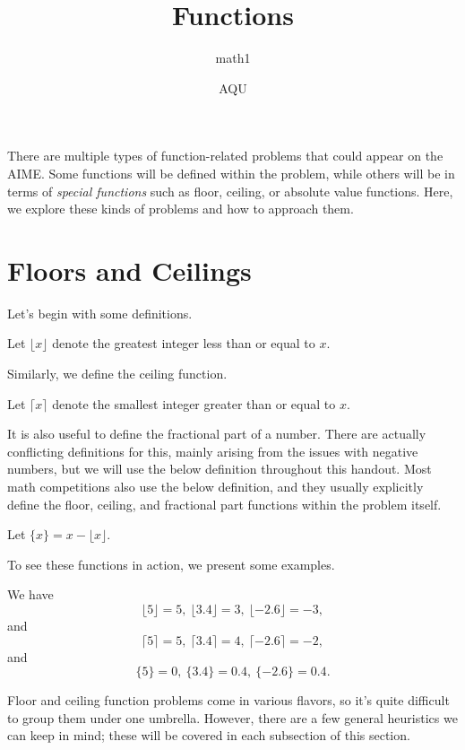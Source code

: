 \documentclass{article}
\title{Functions}
\author{math1}
\date{AQU}
\begin{document}
\maketitle
There are multiple types of function-related problems that could appear on the AIME.  Some functions will be defined within the problem,  while others will be in terms of \emph{special functions} such as floor,  ceiling, or absolute value functions.  Here, we explore these kinds of problems and how to approach them.

\section{Floors and Ceilings}

Let's begin with some definitions.

\begin{defi}
Let $\lfloor x \rfloor$ denote the greatest integer less than or equal to $x$.
\end{defi}

Similarly, we define the ceiling function.

\begin{defi}
Let $\lceil x \rceil$ denote the smallest integer greater than or equal to $x$.
\end{defi}

It is also useful to define the fractional part of a number. There are actually conflicting definitions for this, mainly arising from the issues with negative numbers, but we will use the below definition throughout this handout. Most math competitions also use the below definition, and they usually explicitly define the floor, ceiling, and fractional part functions within the problem itself.

\begin{defi}
Let $\{ x \} = x - \lfloor x \rfloor$.
\end{defi}

To see these functions in action, we present some examples.

\begin{exam}
We have $$\lfloor 5 \rfloor = 5, \ \lfloor 3.4 \rfloor = 3, \ \lfloor -2.6 \rfloor = -3,$$
and $$\lceil 5 \rceil = 5, \ \lceil 3.4 \rceil = 4, \ \lceil -2.6 \rceil = -2,$$
and $$\{ 5 \} = 0, \ \{ 3.4 \} = 0.4, \ \{ -2.6 \} = 0.4.$$
\end{exam}

Floor and ceiling function problems come in various flavors, so it's quite difficult to group them under one umbrella. However, there are a few general heuristics we can keep in mind; these will be covered in each subsection of this section.
\end{document}
